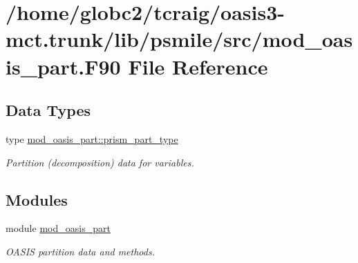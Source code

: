 \hypertarget{mod__oasis__part_8_f90}{}\section{/home/globc2/tcraig/oasis3-\/mct.trunk/lib/psmile/src/mod\+\_\+oasis\+\_\+part.F90 File Reference}
\label{mod__oasis__part_8_f90}
\subsection*{Data Types}
\begin{DoxyCompactItemize}
\item 
type \hyperlink{structmod__oasis__part_1_1prism__part__type}{mod\+\_\+oasis\+\_\+part\+::prism\+\_\+part\+\_\+type}
\begin{DoxyCompactList}\small\item\em Partition (decomposition) data for variables. \end{DoxyCompactList}\end{DoxyCompactItemize}
\subsection*{Modules}
\begin{DoxyCompactItemize}
\item 
module \hyperlink{namespacemod__oasis__part}{mod\+\_\+oasis\+\_\+part}
\begin{DoxyCompactList}\small\item\em O\+A\+S\+IS partition data and methods. \end{DoxyCompactList}\end{DoxyCompactItemize}
